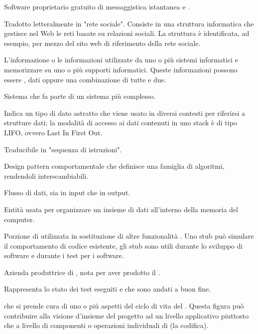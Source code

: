 {Software proprietario gratuito di messaggistica istantanea e .}

{Tradotto letteralmente in "rete sociale". Consiste in una struttura informatica che gestisce nel Web le reti basate su relazioni sociali. La struttura è identificata, ad esempio, per mezzo del sito web di riferimento della rete sociale.}

{L'informazione o le informazioni utilizzate da uno o più sistemi informatici e memorizzare su uno o più supporti informatici. Queste informazioni possono essere , dati oppure una combinazione di tutte e due.}

{Sistema che fa parte di un sistema più complesso.}

{Indica un tipo di dato astratto che viene usato in diversi contesti per riferirsi a strutture dati; la modalità di accesso ai dati contenuti in uno stack è di tipo LIFO, ovvero Last In First Out.}

{Traducibile in "sequenza di istruzioni".}

{Design pattern comportamentale che definisce una famiglia di algoritmi, rendendoli interscambiabili.}

{Flusso di dati, sia in input che in output.}

{Entità usata per organizzare un insieme di dati all'interno della memoria del computer.}

{Porzione di  utilizzata in sostituzione di altre funzionalità . Uno stub può simulare il comportamento di codice esistente, gli stub sono utili durante lo sviluppo di software e durante i test per i software.}

{Azienda produttrice di , nota per aver prodotto il  .}

{Rappresenta lo stato dei test eseguiti e che sono andati a buon fine.}

{ che si prende cura di uno o più aspetti del ciclo di vita del . Questa figura può contribuire alla visione d'insieme del progetto ad un livello applicativo piuttosto che a livello di componenti o operazioni individuali di  (la codifica).}



